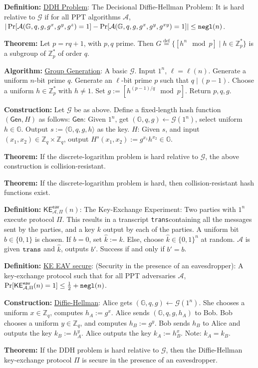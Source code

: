 \documentclass[10pt]{article}
\newcommand{\Z}{\mathbb{Z}}
\newcommand{\G}{\mathbb{G}}
\newcommand{\AAA}{\mathcal{A}}
\newcommand{\GGG}{\mathcal{G}}
\newcommand{\defn}[1]{{\bf Definition:} \underline{#1}}
\newcommand{\thm}[1]{{\bf Theorem:} \underline{#1}}
\newcommand{\con}[1]{{\bf Construction:} \underline{#1}}
\newcommand{\alg}[1]{{\bf Algorithm:} \underline{#1}}
\newcommand{\Gen}{\mathsf{Gen}}
\newcommand{\ang}[1]{\langle#1\rangle}
\newcommand{\ExptKEArgs}[2]{\mathsf{KE}^{\mathsf{eav}}_{#1,#2}}
\newcommand{\ExptKE}{\ExptKEArgs{\AAA}{\Pi}}
\newcommand{\negl}{{\tt negl}}
\newcommand{\trans}{{\tt trans}}
\newcommand{\from}{\leftarrow}
\begin{document}
\begin{multicols}{4}
\defn{DDH Problem}: The Decisional Diffie-Hellman Problem: It is hard relative to $\GGG$ if for all PPT algorithms $\AAA$, $|\Pr[\AAA(\G,q,g,g^x,g^y,g^z)=1]-\Pr[\AAA(\G,q,g,g^x,g^y,g^{xy})=1]|\leq\negl(n)$.

\thm{}Let $p=rq+1$, with $p,q$ prime. Then $G\overset{\text{def}}{=}\{[h^n\mod{p}]\mid h\in\Z^*_p\}$ is a subgroup of $\Z^*_p$ of order $q$.

\alg{Group Generation}: A basic $\GGG$. Input $1^n$, $\ell=\ell(n)$. Generate a uniform $n$-bit prime $q$. Generate an $\ell$-bit prime $p$ such that $q\mid (p-1)$. Choose a uniform $h\in\Z_p^*$ with $h\neq 1$. Set $g:=[h^{(p-1)/q}\mod{p}]$. Return $p,q,g$.

\con{}Let $\GGG$ be as above. Define a fixed-length hash function $(\Gen,H)$ as follows: $\Gen$: Given $1^n$, get $(\G,q,g)\from\GGG(1^n)$, select uniform $h\in\G$. Output $s:=\ang{\G,q,g,h}$ as the key. $H$: Given $s$, and input $(x_1,x_2)\in\Z_q\times\Z_q$, output $H^s(x_1,x_2):=g^{x_1}h^{x_2}\in\G$.

\thm{}If the discrete-logarithm problem is hard relative to $\GGG$, the above construction is collision-resistant.

\thm{}If the discrete-logarithm problem is hard, then collision-resistant hash functions exist.

\defn{$\ExptKE(n)$}: The Key-Exchange Experiment: Two parties with $1^n$ execute protocol $\Pi$. This results in a transcript \trans containing all the messages sent by the parties, and a key $k$ output by each of the parties. A uniform bit $b\in\{0,1\}$ is chosen. If $b=0$, set $\hat{k}:=k$. Else, choose $\hat{k}\in\{0,1\}^n$ at random. $\AAA$ is given $\trans$ and $\hat{k}$, outputs $b'$. Success if and only if $b'=b$.

\defn{KE EAV secure}: (Security in the presence of an eavesdropper): A key-exchange protocol such that for all PPT adversaries $\AAA$, $\Pr[\ExptKE(n)=1]\leq\frac{1}{2}+\negl(n)$.

\con{Diffie-Hellman}: Alice gets $(\G,q,g)\from\GGG(1^n)$. She chooses a uniform $x\in\Z_q$, computes $h_A:=g^x$. Alice sends $(\G,q,g,h_A)$ to Bob. Bob chooses a uniform $y\in\Z_q$, and computes $h_B:=g^y$. Bob sends $h_B$ to Alice and outputs the key $k_B:=h^y_A$. Alice outputs the key $k_A:=h_B^x$. Note: $k_A=k_B$.

\thm{}If the DDH problem is hard relative to $\GGG$, then the Diffie-Hellman key-exchange protocol $\Pi$ is secure in the presence of an eavesdropper.


\end{multicols}
\end{document}
